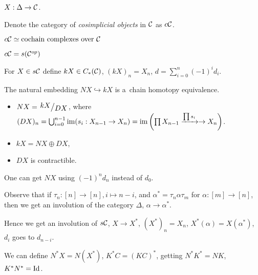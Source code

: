 



    \begin{definition}
        $X:\Delta \to \mathcal{C}$.
        
        Denote the category of {\em cosimplicial objects} in $\mathcal{C}$ as $c\mathcal{C}$.
    \end{definition}
    
    \begin{theorem}
        $c\mathcal{C} \simeq \text{cochain complexes over }\mathcal{C}$
    \end{theorem}
    
    \begin{remark}
        $c\mathcal{C} = s(\mathcal{C}^{op})$
    \end{remark}
    
    \begin{definition}
        For $X \in s\mathcal{C}$ define $kX \in C_\ast(\mathcal{C})$,
        $(kX)_n = X_n$, $d=\sum_{i=0}^n (-1)^i d_i$.
    \end{definition}
    
    \begin{theorem}
        The natural embedding $NX \hookrightarrow kX$
        is a~chain homotopy equivalence.
    \end{theorem}
    
    \begin{remark}
        \begin{itemize}
            \item $NX = \bigslant{kX}{DX}$, where 
            $(DX)_n = \bigcup_{i=0}^{n-1} 
            {\mathrm{im}}(s_i:X_{n-1} \to X_n)
            = {\mathrm{im}}\left(\prod X_{n-1} \xrightarrow{\prod s_i} \to X_n\right)$.
            \item $kX = NX \oplus DX$,
            \item $DX$ is contractible.
        \end{itemize}
    \end{remark}
    
    \begin{remark}
        One can get $NX$  using $(-1)^n d_n$ instead of $d_0$.
    \end{remark}
    
    \begin{remark}
        Observe that if $\tau_n:[n]\to[n], i \mapsto n-i$,
        and $\alpha^\ast = \tau_n \alpha \tau_m$ for
        $\alpha:[m]\to[n]$, then we get an involution of the category $\Delta$,
        $\alpha \to \alpha^\ast$.
        
        Hence we get an involution of $s\mathcal{C}$,
        $X \to X^\ast$, $(X^\ast)_n = X_n$, $X^\ast(\alpha) = X(\alpha^\ast)$,
        $d_i$ goes to $d_{n-i}$.
        
        We can define $N^\ast X = N(X^\ast)$, $K^\ast C = (KC)^\ast$,
        getting $N^\ast K^\ast = NK$, $K^\ast N^\ast = {\mathrm{Id}}$.
    \end{remark}
    
